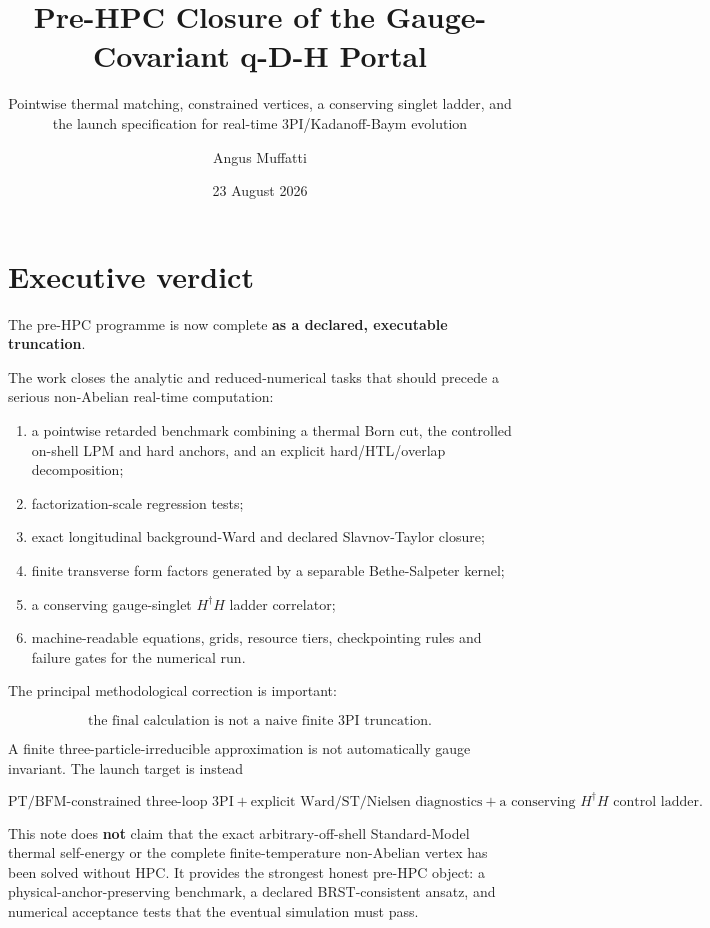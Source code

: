 \documentclass[
  10pt,
]{article}
\title{Pre-HPC Closure of the Gauge-Covariant q-D-H Portal}
\subtitle{Pointwise thermal matching, constrained vertices, a conserving
singlet ladder, and the launch specification for real-time
3PI/Kadanoff-Baym evolution}
\author{Angus Muffatti}
\date{23 August 2026}
\providecommand{\tightlist}{%
  \setlength{\itemsep}{0pt}\setlength{\parskip}{0pt}}
\begin{document}
\maketitle

{
\hypersetup{linkcolor=}
\setcounter{tocdepth}{3}
\tableofcontents
}
\section{Executive verdict}\label{executive-verdict}

The pre-HPC programme is now complete \textbf{as a declared, executable
truncation}.

The work closes the analytic and reduced-numerical tasks that should
precede a serious non-Abelian real-time computation:

\begin{enumerate}
\def\labelenumi{\arabic{enumi}.}
\tightlist
\item
  a pointwise retarded benchmark combining a thermal Born cut, the
  controlled on-shell LPM and hard anchors, and an explicit
  hard/HTL/overlap decomposition;
\item
  factorization-scale regression tests;
\item
  exact longitudinal background-Ward and declared Slavnov-Taylor
  closure;
\item
  finite transverse form factors generated by a separable Bethe-Salpeter
  kernel;
\item
  a conserving gauge-singlet \(H^\dagger H\) ladder correlator;
\item
  machine-readable equations, grids, resource tiers, checkpointing rules
  and failure gates for the numerical run.
\end{enumerate}

The principal methodological correction is important:

\[
\boxed{
\text{the final calculation is not a naive finite 3PI truncation.}
}
\]

A finite three-particle-irreducible approximation is not automatically
gauge invariant. The launch target is instead

\[
\boxed{
\text{PT/BFM-constrained three-loop 3PI}
+
\text{explicit Ward/ST/Nielsen diagnostics}
+
\text{a conserving }H^\dagger H\text{ control ladder}.
}
\]

This note does \textbf{not} claim that the exact arbitrary-off-shell
Standard-Model thermal self-energy or the complete finite-temperature
non-Abelian vertex has been solved without HPC. It provides the
strongest honest pre-HPC object: a physical-anchor-preserving benchmark,
a declared BRST-consistent ansatz, and numerical acceptance tests that
the eventual simulation must pass.
\end{document}

